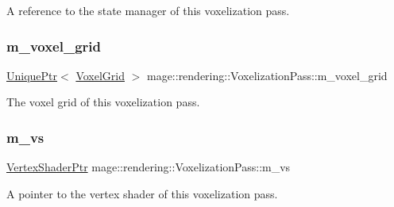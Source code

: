 A reference to the state manager of this voxelization pass. \hypertarget{classmage_1_1rendering_1_1_voxelization_pass_a5263939327363598c9d628db79b3cc49}{}\label{classmage_1_1rendering_1_1_voxelization_pass_a5263939327363598c9d628db79b3cc49} 
\subsubsection{\texorpdfstring{m\+\_\+voxel\+\_\+grid}{m\_voxel\_grid}}
{\footnotesize\ttfamily \hyperlink{namespacemage_a3316d7143a973e37adf1110f2e80ca31}{Unique\+Ptr}$<$ \hyperlink{classmage_1_1rendering_1_1_voxel_grid}{Voxel\+Grid} $>$ mage\+::rendering\+::\+Voxelization\+Pass\+::m\+\_\+voxel\+\_\+grid\hspace{0.3cm}{\ttfamily [private]}}

The voxel grid of this voxelization pass. \hypertarget{classmage_1_1rendering_1_1_voxelization_pass_aa95ee5cba6cfdf82d115f080421aee1c}{}\label{classmage_1_1rendering_1_1_voxelization_pass_aa95ee5cba6cfdf82d115f080421aee1c} 
\subsubsection{\texorpdfstring{m\+\_\+vs}{m\_vs}}
{\footnotesize\ttfamily \hyperlink{namespacemage_1_1rendering_aaf704b9c54a4181f4950a1761de69dda}{Vertex\+Shader\+Ptr} mage\+::rendering\+::\+Voxelization\+Pass\+::m\+\_\+vs\hspace{0.3cm}{\ttfamily [private]}}

A pointer to the vertex shader of this voxelization pass. 